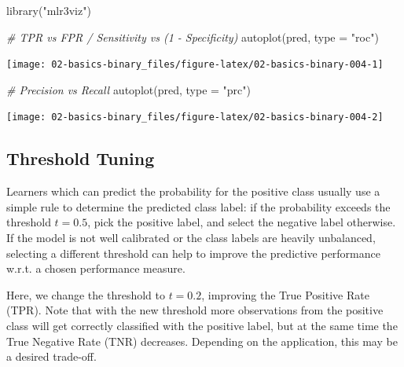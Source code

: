 \documentclass[
]{scrbook}
\newenvironment{Shaded}{\begin{snugshade}}{\end{snugshade}}
\newcommand{\AttributeTok}[1]{\textcolor[rgb]{0.77,0.63,0.00}{#1}}
\newcommand{\CommentTok}[1]{\textcolor[rgb]{0.56,0.35,0.01}{\textit{#1}}}
\newcommand{\FunctionTok}[1]{\textcolor[rgb]{0.00,0.00,0.00}{#1}}
\newcommand{\NormalTok}[1]{#1}
\newcommand{\OtherTok}[1]{\textcolor[rgb]{0.56,0.35,0.01}{#1}}
\newcommand{\SpecialCharTok}[1]{\textcolor[rgb]{0.00,0.00,0.00}{#1}}
\newcommand{\StringTok}[1]{\textcolor[rgb]{0.31,0.60,0.02}{#1}}
\renewenvironment{Shaded} {\begin{snugshade}\small} {\end{snugshade}}
\begin{document}
\begin{Shaded}
\begin{Highlighting}[]
\FunctionTok{library}\NormalTok{(}\StringTok{"mlr3viz"}\NormalTok{)}

\CommentTok{\# TPR vs FPR / Sensitivity vs (1 {-} Specificity)}
\FunctionTok{autoplot}\NormalTok{(pred, }\AttributeTok{type =} \StringTok{"roc"}\NormalTok{)}
\end{Highlighting}
\end{Shaded}

\begin{center}\texttt{[image: 02-basics-binary\_files/figure-latex/02-basics-binary-004-1]} \end{center}

\begin{Shaded}
\begin{Highlighting}[]
\CommentTok{\# Precision vs Recall}
\FunctionTok{autoplot}\NormalTok{(pred, }\AttributeTok{type =} \StringTok{"prc"}\NormalTok{)}
\end{Highlighting}
\end{Shaded}

\begin{center}\texttt{[image: 02-basics-binary\_files/figure-latex/02-basics-binary-004-2]} \end{center}

\hypertarget{threshold-tuning}{%
\subsection{Threshold Tuning}\label{threshold-tuning}}

Learners which can predict the probability for the positive class usually use a simple rule to determine the predicted class label: if the probability exceeds the threshold \(t = 0.5\), pick the positive label, and select the negative label otherwise.
If the model is not well calibrated or the class labels are heavily unbalanced, selecting a different threshold can help to improve the predictive performance w.r.t. a chosen performance measure.

Here, we change the threshold to \(t = 0.2\), improving the True Positive Rate (TPR).
Note that with the new threshold more observations from the positive class will get correctly classified with the positive label, but at the same time the True Negative Rate (TNR) decreases.
Depending on the application, this may be a desired trade-off.

\begin{Shaded}
\end{Shaded}
\end{document}
